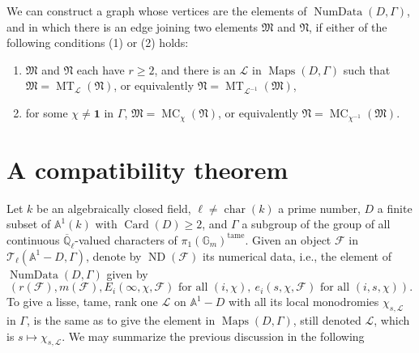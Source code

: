 We can construct a graph whose vertices are the elements of \(\operatorname{NumData}(D,\Gamma)\), and in which there is an edge joining two elements \(\mathfrak{M}\) and \(\mathfrak{N}\), if either of the following conditions (1) or (2) holds:
\begin{enumerate}[label=(\arabic*)]
\item \(\mathfrak{M}\) and \(\mathfrak{N}\) each have \(r\geq 2\), and there is an \(\mathcal{L}\) in \(\operatorname{Maps}(D,\Gamma)\) such that \(\mathfrak{M}=\operatorname{MT}_{\mathcal{L}}(\mathfrak{N})\), or equivalently \(\mathfrak{N}=\operatorname{MT}_{\mathcal{L}^{-1}}(\mathfrak{M})\),
\item for some \(\chi\ne\mathbf{1}\) in \(\Gamma\), \(\mathfrak{M}=\operatorname{MC}_\chi(\mathfrak{N})\), or equivalently \(\mathfrak{N}=\operatorname{MC}_{\chi^{-1}}(\mathfrak{M})\).
\end{enumerate}

\section{A compatibility theorem}
\label{sec:6.2}

Let \(k\) be an algebraically closed field, \(\ell\ne\operatorname{char}(k)\) a prime number, \(D\) a finite subset of \(\mathbb{A}^1(k)\) with \(\operatorname{Card}(D)\geq 2\), and \(\Gamma\) a subgroup of the group of all continuous \(\overline{\mathbb{Q}}_\ell\)-valued characters of \(\pi_1(\mathbb{G}_m)^{\mathrm{tame}}\). Given an object \(\mathcal{F}\) in \(\mathcal{T}_\ell(\mathbb{A}^1-D,\Gamma)\), denote by \(\operatorname{ND}(\mathcal{F})\) its numerical data, i.e., the element of \(\operatorname{NumData}(D,\Gamma)\) given by
\[
(r(\mathcal{F}),m(\mathcal{F}),E_i(\infty,\chi,\mathcal{F})\text{ for all }(i,\chi),\ e_i(s,\chi,\mathcal{F})\text{ for all }(i,s,\chi)).
\]
To give a lisse, tame, rank one \(\mathcal{L}\) on \(\mathbb{A}^1-D\) with all its local monodromies \(\chi_{s,\mathcal{L}}\) in \(\Gamma\), is the same as to give the element in \(\operatorname{Maps}(D,\Gamma)\), still denoted \(\mathcal{L}\), which is \(s\mapsto\chi_{s,\mathcal{L}}\). We may summarize the previous discussion in the following

